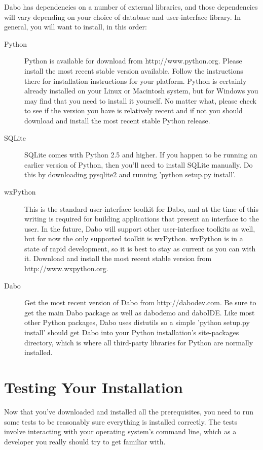 Dabo has dependencies on a number of external libraries, and those dependencies 
will vary depending on your choice of database and user-interface library. In general, 
you will want to install, in this order:
\begin{description}
	\item[Python] Python is available for download from http://www.python.org.  
	Please install the most recent stable version available. Follow the instructions 
	there for installation instructions for your platform. Python is certainly already 
	installed on your Linux or Macintosh system, but for Windows you may find that 
	you need to install it yourself. No matter what, please check to see if the version 
	you have is relatively recent and if not you should download and install the most 
	recent stable Python release.

	\item[SQLite] SQLite comes with Python 2.5 and higher. If you happen to be 
	running an earlier version of Python, then you'll need to install SQLite manually. 
	Do this by downloading pysqlite2 and running 'python setup.py install'.

	\item[wxPython] This is the standard user-interface toolkit for Dabo, and at the 
	time of this writing is required for building applications that present an interface 
	to the user. In the future, Dabo will support other user-interface toolkits as well, 
	but for now the only supported toolkit is wxPython. wxPython is in a state of 
	rapid development, so it is best to stay as current as you can with it. Download 
	and install the most recent stable version from http://www.wxpython.org.

	\item[Dabo] Get the most recent version of Dabo from http://dabodev.com. Be 
	sure to get the main Dabo package as well as dabodemo and daboIDE. Like most 
	other Python packages, Dabo uses distutils so a simple 'python setup.py install' 
	should get Dabo into your Python installation's site-packages directory, which is 
	where all third-party libraries for Python are normally installed.
\end{description}

\section{Testing Your Installation}

Now that you've downloaded and installed all the prerequisites, you need to run 
some tests to be reasonably sure everything is installed correctly. The tests involve 
interacting with your operating system's command line, which as a developer you 
really should try to get familiar with.

